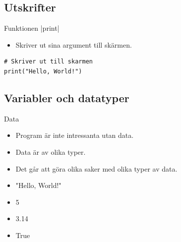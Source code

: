 \subsection{Utskrifter}

\begin{frame}[fragile]
  \begin{block}{Funktionen |print|}
    \begin{itemize}
      \item Skriver ut sina argument till skärmen.
    \end{itemize}
  \end{block}

  \pause

  \begin{example}
    \begin{verbatim}
# Skriver ut till skarmen
print("Hello, World!")
    \end{verbatim}
  \end{example}
\end{frame}


\subsection{Variabler och datatyper}

\begin{frame}
  \begin{block}{Data}
    \begin{itemize}
      \item Program är inte intressanta utan data.
      \item Data är av olika typer.
      \item Det går att göra olika saker med olika typer av data.
    \end{itemize}
  \end{block}

  \pause

  \begin{example}[Litteraler]
    \begin{itemize}
      \item "Hello, World!"
      \item 5
      \item 3.14
      \item True
    \end{itemize}
  \end{example}
\end{frame}

